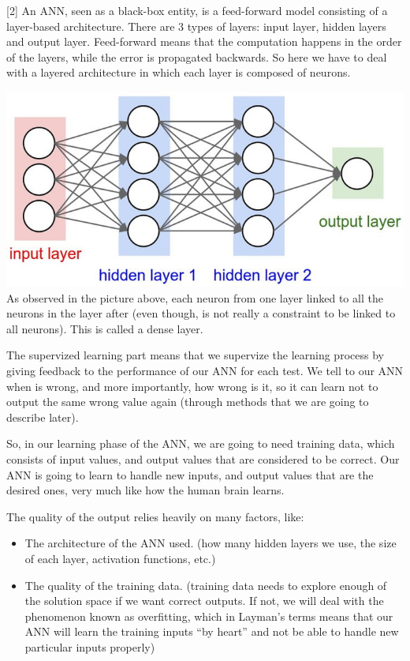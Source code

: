 \documentclass[11pt]{article}
\makeatletter
\def\maxwidth{\ifdim\Gin@nat@width>\linewidth\linewidth
    \else\Gin@nat@width\fi}
\let\Oldincludegraphics\includegraphics
\renewcommand{\includegraphics}[1]{\Oldincludegraphics[width=.8\maxwidth]{#1}}
\providecommand{\tightlist}{%
      \setlength{\itemsep}{0pt}\setlength{\parskip}{0pt}}
\makeatother
\begin{document}
{[}2{]} An ANN, seen as a black-box entity, is a feed-forward model
consisting of a layer-based architecture. There are 3 types of layers:
input layer, hidden layers and output layer. Feed-forward means that the
computation happens in the order of the layers, while the error is
propagated backwards. So here we have to deal with a layered
architecture in which each layer is composed of neurons.

\includegraphics{gfx/ann.jpg} As observed in the picture above, each
neuron from one layer linked to all the neurons in the layer after (even
though, is not really a constraint to be linked to all neurons). This is
called a dense layer.

The supervized learning part means that we supervize the learning
process by giving feedback to the performance of our ANN for each test.
We tell to our ANN when is wrong, and more importantly, how wrong is it,
so it can learn not to output the same wrong value again (through
methods that we are going to describe later).

So, in our learning phase of the ANN, we are going to need training
data, which consists of input values, and output values that are
considered to be correct. Our ANN is going to learn to handle new
inputs, and output values that are the desired ones, very much like how
the human brain learns.

The quality of the output relies heavily on many factors, like:

\begin{itemize}
\tightlist
\item
  The architecture of the ANN used. (how many hidden layers we use, the
  size of each layer, activation functions, etc.)
\item
  The quality of the training data. (training data needs to explore
  enough of the solution space if we want correct outputs. If not, we
  will deal with the phenomenon known as overfitting, which in Layman's
  terms means that our ANN will learn the training inputs ``by heart''
  and not be able to handle new particular inputs properly)
\end{itemize}
\end{document}
